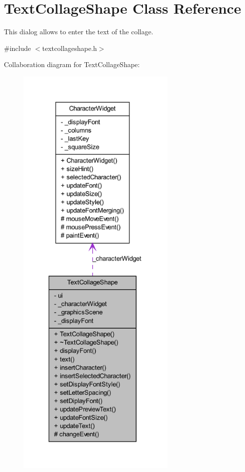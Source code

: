 \hypertarget{class_text_collage_shape}{
\section{TextCollageShape Class Reference}
\label{class_text_collage_shape}
}


This dialog allows to enter the text of the collage.  




{\ttfamily \#include $<$textcollageshape.h$>$}



Collaboration diagram for TextCollageShape:
\nopagebreak
\begin{figure}[H]
\begin{center}
\leavevmode
\includegraphics[height=600pt]{class_text_collage_shape__coll__graph}
\end{center}
\end{figure}
